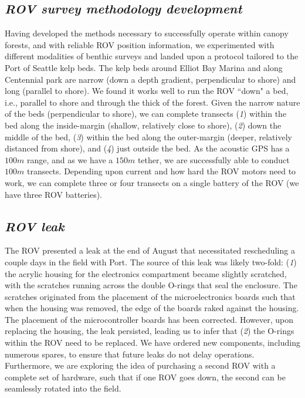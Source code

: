 \documentclass[11pt]{article}
\begin{document}
\subsection{\textit{ROV survey methodology development}}
Having developed the methods necessary to successfully operate within 
canopy forests, and with reliable ROV position information, we 
experimented with different modalities of benthic surveys and landed 
upon a protocol tailored to the Port of Seattle kelp beds. 
The kelp beds around Elliot Bay Marina and along Centennial park are 
narrow (down a depth gradient, perpendicular to shore) and long 
(parallel to shore). 
We found it works well to run the ROV ``down" a bed, i.e., parallel to 
shore and through the thick of the forest. 
Given the narrow nature of the beds (perpendicular to shore), we can 
complete transects 
(\textit{1}) within the bed along the inside-margin (shallow, 
relatively close to shore), 
(\textit{2}) down the middle of the bed, 
(\textit{3}) within the bed along the outer-margin (deeper, relatively 
distanced from shore), and 
(\textit{4}) just outside the bed.
As the acoustic GPS has a $100m$ range, and as we have a $150m$ tether, 
we are successfully able to conduct $100m$ transects.  
Depending upon current and how hard the ROV motors need to work, we can 
complete three or four transects on a single battery of the ROV (we 
have three ROV batteries).

\subsection{\textit{ROV leak}}
The ROV presented a leak at the end of August that necessitated rescheduling a couple days in the field with Port. 
The source of this leak was likely two-fold: 
(\textit{1}) the acrylic housing for the electronics compartment became 
slightly scratched, with the scratches running across the double 
O-rings that seal the enclosure. 
The scratches originated from the placement of the microelectronics boards such that when the housing was removed, the edge of the boards raked against the housing. 
The placement of the microcontroller boards has been corrected. 
However, upon replacing the housing, the leak persisted, leading 
us to infer that 
(\textit{2}) the O-rings within the ROV need to be replaced. 
We have ordered new components, including numerous spares, to ensure 
that future leaks do not delay operations. 
Furthermore, we are exploring the idea of purchasing a second ROV with 
a complete set of hardware, such that if one ROV goes down, the second 
can be seamlessly rotated into the field. 
\end{document}
